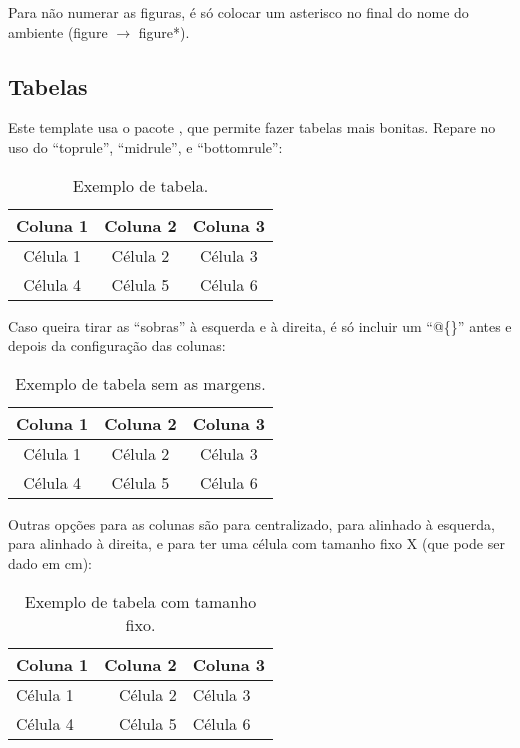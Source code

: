     Para não numerar as figuras, é só colocar um asterisco no final do nome do ambiente (figure $\rightarrow$ figure*).
    
    \subsection{Tabelas}
      Este template usa o pacote , que permite fazer tabelas mais bonitas. Repare no uso do ``toprule'', ``midrule'', e ``bottomrule'':
      \begin{table}[h!]
        \centering
        \caption{Exemplo de tabela.}
        \label{tab:ex_1}
        \begin{tabular}{ccc}
          \toprule
          \textbf{Coluna 1} & \textbf{Coluna 2} & \textbf{Coluna 3} \\ \midrule
          Célula 1          & Célula 2          & Célula 3          \\ 
          Célula 4          & Célula 5          & Célula 6          \\ 
          \bottomrule
        \end{tabular}
      \end{table}

      Caso queira tirar as ``sobras'' à esquerda e à direita, é só incluir um ``@\{\}'' antes e depois da configuração das colunas:
      \begin{table}[h!]
        \centering
        \caption{Exemplo de tabela sem as margens.}
        \label{tab:ex_2}
        \begin{tabular}{@{}ccc@{}}
          \toprule
          \textbf{Coluna 1} & \textbf{Coluna 2} & \textbf{Coluna 3} \\ \midrule
          Célula 1          & Célula 2          & Célula 3          \\ 
          Célula 4          & Célula 5          & Célula 6          \\ 
          \bottomrule
        \end{tabular}
      \end{table}

      Outras opções para as colunas são  para centralizado,  para alinhado à esquerda,  para alinhado à direita, e  para ter uma célula com tamanho fixo X (que pode ser dado em cm):
      \begin{table}[h!]
        \centering
        \caption{Exemplo de tabela com tamanho fixo.}
        \label{tab:ex_3}
        \begin{tabular}{@{}lrp{5cm}@{}}
          \toprule
          \textbf{Coluna 1} & \textbf{Coluna 2} & \textbf{Coluna 3} \\ \midrule
          Célula 1          & Célula 2          & Célula 3          \\ 
          Célula 4          & Célula 5          & Célula 6          \\ 
          \bottomrule
        \end{tabular}
      \end{table}

